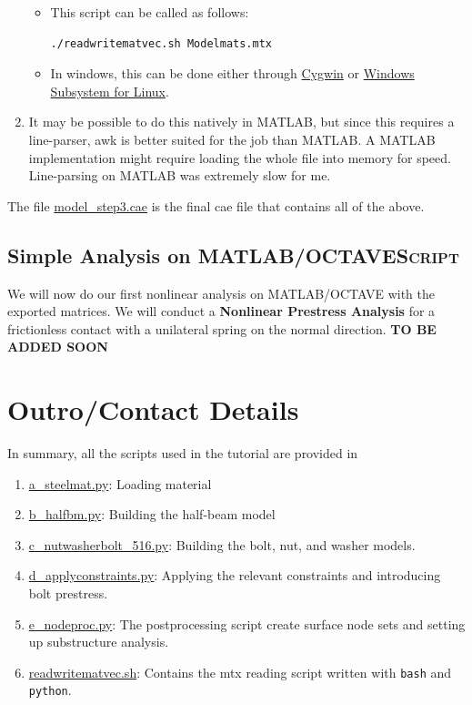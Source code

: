 \documentclass[11pt]{article}
\begin{document}
\begin{enumerate}
\begin{itemize}
\item This script can be called as follows:
\begin{verbatim}
./readwritematvec.sh Modelmats.mtx
\end{verbatim}
\item In windows, this can be done either through \href{https://www.cygwin.com/}{Cygwin} or \href{https://learn.microsoft.com/en-us/windows/wsl/install}{Windows Subsystem for Linux}.
\end{itemize}
\item It may be possible to do this natively in MATLAB, but since this requires a line-parser, awk is better suited for the job than MATLAB.
A MATLAB implementation might require loading the whole file into memory for speed.
Line-parsing on MATLAB was extremely slow for me.
\end{enumerate}
The file \href{https://github.com/Nidish96/Abaqus4Joints/blob/main/assets/assembly/model\_step3.cae}{model\_step3.cae} is the final cae file that contains all of the above.
\subsection{Simple Analysis on MATLAB/OCTAVE\hfill{}\textsc{Script}}
\label{sec:org0364a6d}
We will now do our first nonlinear analysis on MATLAB/OCTAVE with the exported matrices.
We will conduct a \textbf{Nonlinear Prestress Analysis} for a frictionless contact with a unilateral spring on the normal direction.
\textbf{TO BE ADDED SOON}

\section{Outro/Contact Details}
\label{sec:org7e27041}
In summary, all the scripts used in the tutorial are provided in 
\begin{enumerate}
\item \href{https://github.com/Nidish96/Abaqus4Joints/blob/main/scripts/a\_steelmat.py}{a\_steelmat.py}: Loading material
\item \href{https://github.com/Nidish96/Abaqus4Joints/blob/main/scripts/b\_halfbm.py}{b\_halfbm.py}: Building the half-beam model
\item \href{https://github.com/Nidish96/Abaqus4Joints/blob/main/scripts/c\_nutwasherbolt\_516.py}{c\_nutwasherbolt\_516.py}: Building the bolt, nut, and washer models.
\item \href{https://github.com/Nidish96/Abaqus4Joints/blob/main/scripts/d\_applyconstraints.py}{d\_applyconstraints.py}: Applying the relevant constraints and introducing bolt prestress.
\item \href{https://github.com/Nidish96/Abaqus4Joints/blob/main/scripts/e\_nodeproc.py}{e\_nodeproc.py}: The postprocessing script create surface node sets and setting up substructure analysis.
\item \href{https://github.com/Nidish96/Abaqus4Joints/blob/main/scripts/readwritematvec.sh}{readwritematvec.sh}: Contains the mtx reading script written with \texttt{bash} and \texttt{python}.
\end{enumerate}
\end{document}
